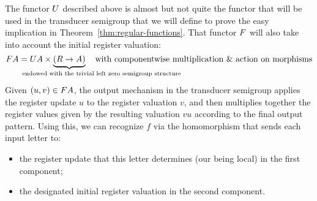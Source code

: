 The functor $\functoru$ described above is almost but not quite the functor that
will be used in the transducer semigroup that we will define to prove the easy
implication in Theorem~\ref{thm:regular-functions}. That functor $\functor$ will
also take into account the initial register valuation:
\[ \functor A =  \functoru A \times \myunderbrace{(R \to A)}{\qquad\qquad\qquad\qquad\qquad endowed with the trivial left zero semigroup structure} \quad\text{with componentwise multiplication \& action on morphisms} \]
Given $(u,v) \in \functor A$, the output mechanism in the transducer semigroup
applies the register update $u$ to the register valuation $v$, and then multiplies together the register values given by the resulting valuation $vu$ according to the final output pattern.
Using this, we can recognize $f$ via the homomorphism that sends each input letter to:
\begin{itemize}
\item the register update that this letter determines (our \sst being local) in
  the first component;
\item the designated initial register valuation in the second component.
\end{itemize}

